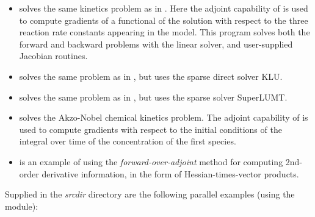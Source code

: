 \begin{itemize}

\item {}
  solves the same kinetics problem as in .
  \newline
  Here the adjoint capability of {\idas} is used to compute gradients
  of a functional of the solution with respect to the three
  reaction rate constants appearing in the model.
  This program solves both the forward and backward problems with the 
  {\sunlinsoldense} linear solver, and user-supplied Jacobian routines.

\item {}
  solves the same problem as in , but
  uses the sparse direct solver KLU.

\item {}
  solves the same problem as in , but
  uses the sparse solver SuperLUMT.

\item {}
  solves the Akzo-Nobel chemical kinetics problem.
  \newline
  The adjoint capability of {\idas} is used to compute gradients with
  respect to the initial conditions of the integral over time of the 
  concentration of the first species.


\item {}
  is an example of using the {\em forward-over-adjoint} method for
  computing 2nd-order derivative information, in the form of Hessian-times-vector
  products.

\end{itemize}


\vspace{0.2in}\noindent 
Supplied in the {\em srcdir} directory are
the following parallel examples (using the {\nvecp} module):

